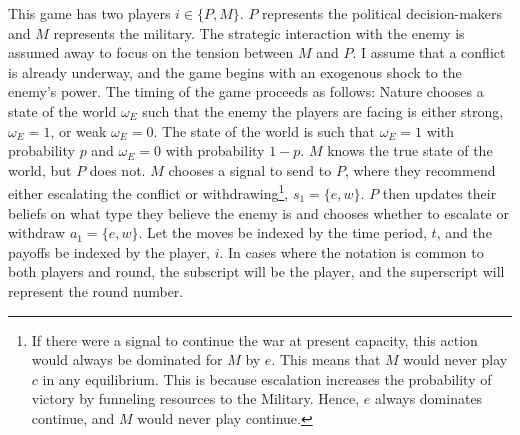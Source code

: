 \documentclass[
  12pt,
]{article}
\theoremstyle{plain}
\theoremstyle{plain}
\theoremstyle{remark}
\begin{document}
This game has two players \(i \in \{P, M \}\). \(P\) represents the
political decision-makers and \(M\) represents the military. The
strategic interaction with the enemy is assumed away to focus on the
tension between \(M\) and \(P\). I assume that a conflict is already
underway, and the game begins with an exogenous shock to the enemy's
power. The timing of the game proceeds as follows: Nature chooses a
state of the world \(\omega_E\) such that the enemy the players are
facing is either strong, \(\omega_E = 1\), or weak \(\omega_E = 0\). The
state of the world is such that \(\omega_E = 1\) with probability \(p\)
and \(\omega_E = 0\) with probability \(1 - p\). \(M\) knows the true
state of the world, but \(P\) does not. \(M\) chooses a signal to send
to \(P\), where they recommend either escalating the conflict or
withdrawing\footnote{If there were a signal to continue the war at
  present capacity, this action would always be dominated for \(M\) by
  \(e\). This means that \(M\) would never play \(c\) in any
  equilibrium. This is because escalation increases the probability of
  victory by funneling resources to the Military. Hence, \(e\) always
  dominates continue, and \(M\) would never play continue.},
\(s_1 = \{e, w\}\). \(P\) then updates their beliefs on what type they
believe the enemy is and chooses whether to escalate or withdraw
\(a_1 = \{e, w\}\). Let the moves be indexed by the time period, \(t\),
and the payoffs be indexed by the player, \(i\). In cases where the
notation is common to both players and round, the subscript will be the
player, and the superscript will represent the round number.
\end{document}
